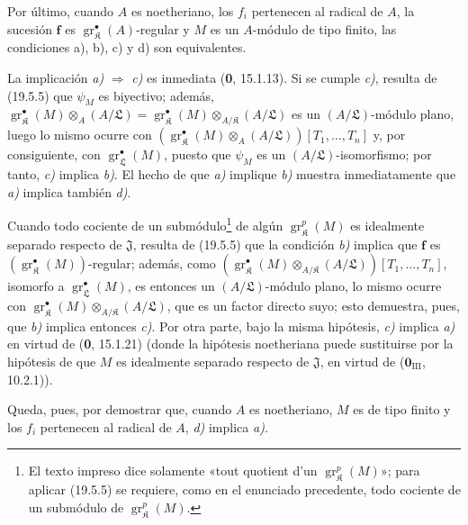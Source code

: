 \begin{theorem}[19.7.1]

Por último, cuando $A$ es noetheriano, los $f_i$ pertenecen al radical de $A$, la sucesión $\mathbf f$ es $\operatorname{gr}_{\mathfrak K}^\bullet(A)$-regular y $M$ es un $A$-módulo de tipo finito, las condiciones \textup{a)}, \textup{b)}, \textup{c)} y \textup{d)} son equivalentes.
\end{theorem}

La implicación \emph{a)} $\Rightarrow$ \emph{c)} es inmediata (\textbf{0}, 15.1.13). Si se cumple \emph{c)}, resulta de (19.5.5) que $\psi_M$ es biyectivo; además, $\operatorname{gr}_{\mathfrak K}^\bullet(M)\otimes_A(A/\mathfrak L)=\operatorname{gr}_{\mathfrak K}^\bullet(M)\otimes_{A/\mathfrak K}(A/\mathfrak L)$ es un $(A/\mathfrak L)$-módulo plano, luego lo mismo ocurre con $(\operatorname{gr}_{\mathfrak K}^\bullet(M)\otimes_A(A/\mathfrak L))[T_1,\ldots,T_n]$ y, por consiguiente, con $\operatorname{gr}_{\mathfrak L}^\bullet(M)$, puesto que $\psi_M$ es un $(A/\mathfrak L)$-isomorfismo; por tanto, \emph{c)} implica \emph{b)}. El hecho de que \emph{a)} implique \emph{b)} muestra inmediatamente que \emph{a)} implica también \emph{d)}.

Cuando todo cociente de un submódulo\footnote{El texto impreso dice solamente «tout quotient d'un $\operatorname{gr}_{\mathfrak K}^p(M)$»; para aplicar (19.5.5) se requiere, como en el enunciado precedente, todo cociente de un submódulo de $\operatorname{gr}_{\mathfrak K}^p(M)$.} de algún $\operatorname{gr}_{\mathfrak K}^p(M)$ es idealmente separado respecto de $\mathfrak J$, resulta de (19.5.5) que la condición \emph{b)} implica que $\mathbf f$ es $(\operatorname{gr}_{\mathfrak K}^\bullet(M))$-regular; además, como $(\operatorname{gr}_{\mathfrak K}^\bullet(M)\otimes_{A/\mathfrak K}(A/\mathfrak L))[T_1,\ldots,T_n]$, isomorfo a $\operatorname{gr}_{\mathfrak L}^\bullet(M)$, es entonces un $(A/\mathfrak L)$-módulo plano, lo mismo ocurre con $\operatorname{gr}_{\mathfrak K}^\bullet(M)\otimes_{A/\mathfrak K}(A/\mathfrak L)$, que es un factor directo suyo; esto demuestra, pues, que \emph{b)} implica entonces \emph{c)}. Por otra parte, bajo la misma hipótesis, \emph{c)} implica \emph{a)} en virtud de (\textbf{0}, 15.1.21) (donde la hipótesis noetheriana puede sustituirse por la hipótesis de que $M$ es idealmente separado respecto de $\mathfrak J$, en virtud de ($\mathbf{0}_{\mathrm{III}}$, 10.2.1)).

Queda, pues, por demostrar que, cuando $A$ es noetheriano, $M$ es de tipo finito y los $f_i$ pertenecen al radical de $A$, \emph{d)} implica \emph{a)}.

